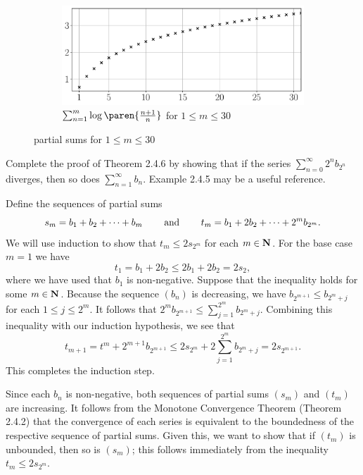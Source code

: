 \documentclass{lew98_solutions}
\begin{document}
\begin{solution}
\begin{figure}[H]
        \begin{subfigure}{0.75\textwidth}
            \includegraphics[width=\textwidth]{UA_Figures/UA_ex2_4_8_fig_c.pdf}
            \caption{\( \sum_{n=1}^m \log \paren{ \tfrac{n+1}{n} } \) for \( 1 \leq m \leq 30 \)}
        \end{subfigure}
        \caption{ partial sums for \( 1 \leq m \leq 30 \)}
        \label{fig:ex2.4.8}
    \end{figure}
\end{solution}

\begin{exercise}
\label{ex:2.4.9}
    Complete the proof of Theorem 2.4.6 by showing that if the series \( \sum_{n=0}^{\infty} 2^n b_{2^n} \) diverges, then so does \( \sum_{n=1}^{\infty} b_n \). Example 2.4.5 may be a useful reference.
\end{exercise}

\begin{solution}
    Define the sequences of partial sums
    \[
        s_m = b_1 + b_2 + \cdots + b_m \hspaceand[8mm] t_m = b_1 + 2 b_2 + \cdots + 2^m b_{2^m}.
    \]
    We will use induction to show that \( t_m \leq 2 s_{2^m} \) for each \( m \in \N \). For the base case \( m = 1 \) we have
    \[
        t_1 = b_1 + 2 b_2 \leq 2 b_1 + 2 b_2 = 2 s_2,
    \]
    where we have used that \( b_1 \) is non-negative. Suppose that the inequality holds for some \( m \in \N \). Because the sequence \( (b_n) \) is decreasing, we have \( b_{2^{m+1}} \leq b_{2^m + j} \) for each \( 1 \leq j \leq 2^m \). It follows that \( 2^m b_{2^{m+1}} \leq \sum_{j=1}^{2^m} b_{2^m + j} \). Combining this inequality with our induction hypothesis, we see that
    \[
        t_{m+1} = t^m + 2^{m+1} b_{2^{m+1}} \leq 2 s_{2^m} + 2 \sum_{j=1}^{2^m} b_{2^m + j} = 2 s_{2^{m+1}}.
    \]
    This completes the induction step.

    Since each \( b_n \) is non-negative, both sequences of partial sums \( (s_m) \) and \( (t_m) \) are increasing. It follows from the Monotone Convergence Theorem (Theorem 2.4.2) that the convergence of each series is equivalent to the boundedness of the respective sequence of partial sums. Given this, we want to show that if \( (t_m) \) is unbounded, then so is \( (s_m) \); this follows immediately from the inequality \( t_m \leq 2 s_{2^m} \).
\end{solution}
\end{document}
